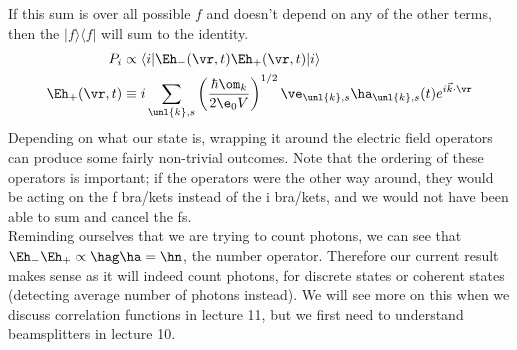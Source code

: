 \documentclass[a4paper, 11pt, normalem]{report}
\begin{document}
If this sum is over all possible $f$ and doesn't depend on any of the other terms, then the $|f\rangle\langle f|$ will sum to the identity.
\begin{align}
    P_i &\propto \langle i|\Eh_-(\vr,t)\Eh_+(\vr,t)|i\rangle \\
    \Eh_+(\vr,t) &\equiv i\sum_{\unl{k},s}\left(\frac{\hbar\om_k}{2\e_0V}\right)^{1/2}\ve_{\unl{k},s}\ha_{\unl{k},s}(t)e^{i\vec{k}\cdot\vr} 
\end{align}
Depending on what our state is, wrapping it around the electric field operators can produce some fairly non-trivial outcomes.
Note that the ordering of these operators is important; if the operators were the other way around, they would be acting on the f bra/kets instead of the i bra/kets, and we would not have been able to sum and cancel the fs.\\
Reminding ourselves that we are trying to count photons, we can see that $\Eh_-\Eh_+ \propto \hag\ha = \hn$, the number operator. 
Therefore our current result makes sense as it will indeed count photons, for discrete states or coherent states (detecting average number of photons instead).
We will see more on this when we discuss correlation functions in lecture 11, but we first need to understand beamsplitters in lecture 10.
\end{document}
